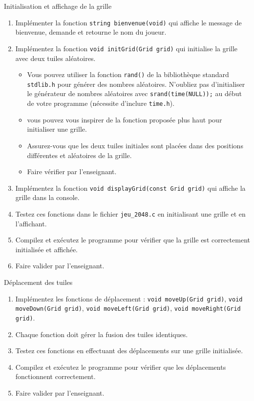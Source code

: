 \begin{UPSTIManipulation}{Initialisation et affichage de la grille}
    \begin{enumerate}
        \item Implémenter la fonction \texttt{string bienvenue(void)} qui affiche le message de bienvenue, demande et retourne le nom du joueur.
        \item Implémentez la fonction \texttt{void initGrid(Grid grid)} qui initialise la grille avec deux tuiles aléatoires.
              \begin{itemize}
                  \item Vous pouvez utiliser la fonction \texttt{rand()} de la bibliothèque standard \texttt{stdlib.h} pour générer des nombres aléatoires. N'oubliez pas d'initialiser le générateur de nombres aléatoires avec \texttt{srand(time(NULL));} au début de votre programme (nécessite d'inclure \texttt{time.h}).
                  \item vous pouvez vous inspirer de la fonction proposée plus haut pour initialiser une grille.
                  \item Assurez-vous que les deux tuiles initiales sont placées dans des positions différentes et aléatoires de la grille.
                  \item Faire vérifier par l'enseignant.
              \end{itemize}
        \item Implémentez la fonction \texttt{void displayGrid(const Grid grid)} qui affiche la grille dans la console.
        \item Testez ces fonctions dans le fichier \texttt{jeu\_2048.c} en initialisant une grille et en l'affichant.
        \item Compilez et exécutez le programme pour vérifier que la grille est correctement initialisée et affichée.
        \item Faire valider par l'enseignant.
    \end{enumerate}
\end{UPSTIManipulation}

\begin{UPSTIManipulation}{Déplacement des tuiles}
    \begin{enumerate}
        \item Implémentez les fonctions de déplacement : \texttt{void moveUp(Grid grid)}, \texttt{void moveDown(Grid grid)}, \texttt{void moveLeft(Grid grid)}, \texttt{void moveRight(Grid grid)}.
        \item Chaque fonction doit gérer la fusion des tuiles identiques.
        \item Testez ces fonctions en effectuant des déplacements sur une grille initialisée.
        \item Compilez et exécutez le programme pour vérifier que les déplacements fonctionnent correctement.
        \item Faire valider par l'enseignant.
    \end{enumerate}
\end{UPSTIManipulation}

